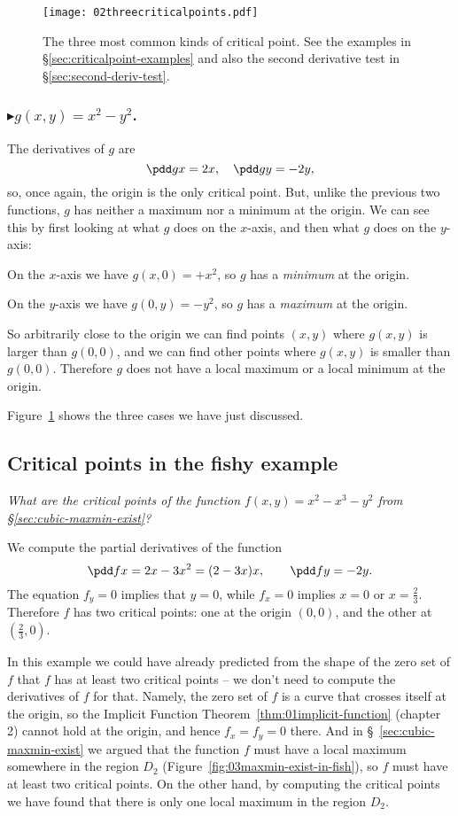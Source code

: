 \begin{figure}[htb]
  \centering
  \texttt{[image: 02threecriticalpoints.pdf]}
  \caption{The three most common kinds of critical point.  See the examples in
    \S\ref{sec:criticalpoint-examples} and also the second derivative test in
    \S\ref{sec:second-deriv-test}.}
  \label{fig:most-common-crpts}
\end{figure}

\subsubsection*{$\blacktriangleright g(x, y) = x^2-y^2$. } 
The derivatives of $g$ are
\[
\pdd gx = 2x, \quad \pdd gy = -2y,
\]
so, once again, the origin is the only critical point.  But, unlike the previous
two functions, $g$ has neither a maximum nor a minimum at the origin.  We can
see this by first looking at what $g$ does on the $x$-axis, and then what $g$
does on the $y$-axis:

On the $x$-axis we have $g(x, 0) = +x^2$, so $g$ has a \emph{minimum} at the
origin.

On the $y$-axis we have $g(0,y) = -y^2$, so $g$ has a \emph{maximum} at the
origin.

So arbitrarily close to the origin we can find points $(x,y)$ where $g(x,y)$ is
larger than $g(0,0)$, and we can find other points where $g(x,y)$ is smaller
than $g(0,0)$.  Therefore $g$ does not have a local maximum or a local minimum
at the origin.

Figure~\ref{fig:most-common-crpts} shows the three cases we have just discussed.


\subsection{Critical points in the fishy example}

\label{sec:critical-fish} 
\textit{What are the critical points of the function $f(x, y) = x^2-x^3-y^2$
  from \S \ref{sec:cubic-maxmin-exist}?}

We compute the partial derivatives of the function
\[
\pdd fx = 2x-3x^2 = (2-3x)x,\qquad \pdd fy = -2y.
\]
The equation $f_y=0$ implies that $y=0$, while $f_x=0$ implies $x=0$ or
$x=\frac{2} {3}$.  Therefore $f$ has two critical points: one at the origin
$(0,0)$, and the other at $(\frac23,0)$.


In this example we could have already predicted from the shape of the zero set
of $f$ that $f$ has at least two critical points -- we don't need to compute the
derivatives of $f$ for that.  Namely, the zero set of $f$ is a curve that
crosses itself at the origin, so the Implicit Function
Theorem~\ref{thm:01implicit-function} (chapter 2) cannot hold at the origin, and
hence $f_x=f_y=0$ there.  And in \S~\ref{sec:cubic-maxmin-exist} we argued that
the function $f$ must have a local maximum somewhere in the region $D_2$
(Figure~\ref{fig:03maxmin-exist-in-fish}), so $f$ must have at least two
critical points.  On the other hand, by computing the critical points we have
found that there is only one local maximum in the region $D_2$.


